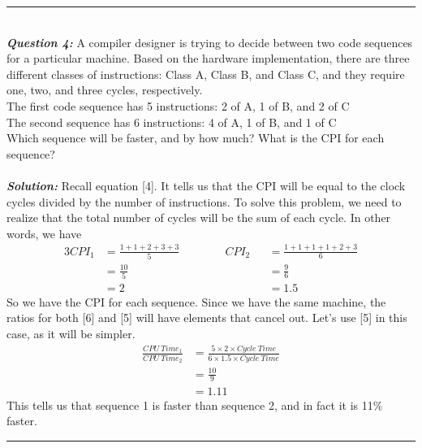\documentclass{article}
\begin{document}
\hrule
\noindent \\
\indent \textit{\textbf{Question 4:}} A compiler designer is trying to decide between two code sequences for a particular machine. Based on the hardware implementation, there are three different classes of instructions: Class A, Class B, and Class C, and they require one, two, and three cycles, respectively.\\
\indent \indent The first code sequence has 5 instructions: 2 of A, 1 of B, and 2 of C\\
\indent \indent The second sequence has 6 instructions: 4 of A, 1 of B, and 1 of C\\
\noindent Which sequence will be faster, and by how much? What is the CPI for each sequence?\\\\
\textit{\textbf{Solution:}} Recall equation [4]. It tells us that the CPI will be equal to the clock cycles divided by the number of instructions. To solve this problem, we need to realize that the total number of cycles will be the sum of each cycle. In other words, we have
\begin{alignat*}{3}
CPI_{1} &= \frac{1 + 1 + 2 + 3 + 3}{5} \qquad\qquad CPI_{2} &&= \frac{1 + 1 + 1 + 1 + 2 + 3}{6}\\
&= \frac{10}{5} &&= \frac{9}{6}\\
&= 2 &&= 1.5
\end{alignat*}
\noindent So we have the CPI for each sequence. Since we have the same machine, the ratios for both [6] and [5] will have elements that cancel out. Let's use [5] in this case, as it will be simpler.
\begin{align*}
\frac{CPU\ Time_{1}}{CPU\ Time_{2}} &= \frac{5 \times 2 \times Cycle\ Time}{6 \times 1.5 \times Cycle\ Time}\\
&= \frac{10}{9}\\
&= 1.11
\end{align*}
\noindent This tells us that sequence 1 is faster than sequence 2, and in fact it is 11\% faster.\\
\hrule
\newpage
\end{document}
